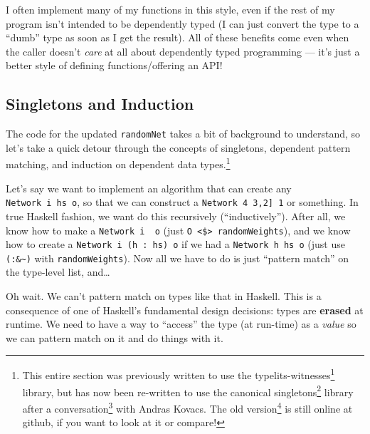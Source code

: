 \documentclass[]{article}
\renewcommand{\href}[2]{#2\footnote{\url{#1}}}
\begin{document}
I often implement many of my functions in this style, even if the rest of my
program isn't intended to be dependently typed (I can just convert the type to a
``dumb'' type as soon as I get the result). All of these benefits come even when
the caller doesn't \emph{care} at all about dependently typed programming ---
it's just a better style of defining functions/offering an API!

\subsection{Singletons and Induction}\label{singletons-and-induction}

The code for the updated \texttt{randomNet} takes a bit of background to
understand, so let's take a quick detour through the concepts of singletons,
dependent pattern matching, and induction on dependent data types.\footnote{This
  entire section was previously written to use the
  \href{http://hackage.haskell.org/package/typelits-witnesses}{typelits-witnesses}
  library, but has now been re-written to use the canonical
  \href{https://hackage.haskell.org/package/singletons}{singletons} library
  after a
  \href{https://www.reddit.com/r/haskell/comments/4l199z/practical_dependent_types_in_haskell_type_safe/d3jkslv}{conversation}
  with Andras Kovacs. The
  \href{https://github.com/mstksg/inCode/blob/697c1f726b9ab9c3f9830ed5521bfeee6ec10727/entry/practical-dependent-types-in-haskell-1.md\#singletons-and-induction}{old
  version} is still online at github, if you want to look at it or compare!}

Let's say we want to implement an algorithm that can create any
\texttt{Network\ i\ hs\ o}, so that we can construct a
\texttt{Network\ 4\ \textquotesingle{}{[}3,2{]}\ 1} or something. In true
Haskell fashion, we want do this recursively (``inductively''). After all, we
know how to make a \texttt{Network\ i\ \textquotesingle{}{[}{]}\ o} (just
\texttt{O\ \textless{}\$\textgreater{}\ randomWeights}), and we know how to
create a \texttt{Network\ i\ (h\ \textquotesingle{}:\ hs)\ o} if we had a
\texttt{Network\ h\ hs\ o} (just use \texttt{(:\&\textasciitilde{})} with
\texttt{randomWeights}). Now all we have to do is just ``pattern match'' on the
type-level list, and\ldots{}

Oh wait. We can't pattern match on types like that in Haskell. This is a
consequence of one of Haskell's fundamental design decisions: types are
\textbf{erased} at runtime. We need to have a way to ``access'' the type (at
run-time) as a \emph{value} so we can pattern match on it and do things with it.
\end{document}
